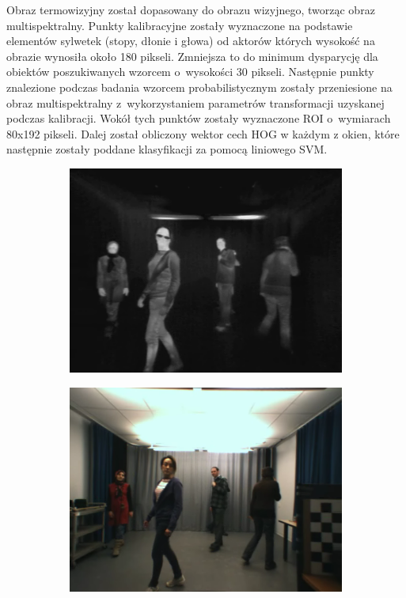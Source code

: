 Obraz termowizyjny został dopasowany do obrazu wizyjnego, tworząc obraz multispektralny. 
Punkty kalibracyjne zostały wyznaczone na podstawie elementów sylwetek (stopy, dłonie i głowa) od aktorów których wysokość na obrazie wynosiła około 180 pikseli. 
Zmniejsza to do minimum dysparycję dla obiektów poszukiwanych wzorcem o~wysokości 30 pikseli. %
Następnie punkty znalezione podczas badania wzorcem probabilistycznym zostały przeniesione na obraz multispektralny z~wykorzystaniem parametrów transformacji uzyskanej podczas kalibracji. 
Wokół tych punktów zostały wyznaczone ROI o~wymiarach 80x192 pikseli.
Dalej został obliczony wektor cech HOG w każdym z okien, które następnie zostały poddane klasyfikacji za pomocą liniowego SVM.
\begin{figure}[h]
\centering
\begin{subfigure}{0.32\textwidth}
\centering
\includegraphics[width=0.9\linewidth]{images/sampleIR}
\subcaption{\label{fig:sampleIR}}
\end{subfigure}
\begin{subfigure}{0.32\textwidth}
\centering
\includegraphics[width=0.9\linewidth]{images/sampleRGB}

\end{subfigure}
\end{figure}

